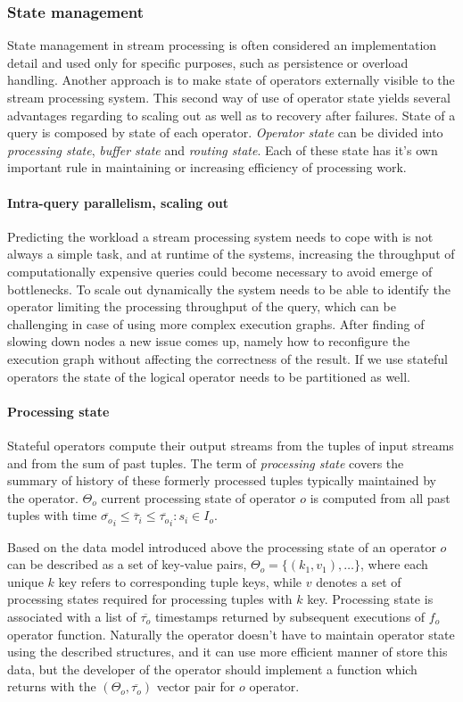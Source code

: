 \subsubsection{State management}
State management in stream processing is often considered an implementation detail and used only for specific purposes, such as persistence or overload handling. Another approach is to make state of operators externally visible to the stream processing system. This second way of use of operator state yields several advantages regarding to scaling out as well as  to recovery after failures.
State of a query is composed by state of each operator. \textit{Operator state} can be divided into \textit{processing state}, \textit{buffer state} and \textit{routing state}. Each of these state has it's own important rule in maintaining or increasing efficiency of processing work.
\paragraph{Intra-query parallelism, scaling out}
Predicting the workload a stream processing system needs to cope with is not always a simple task, and at runtime of the systems, increasing the throughput of computationally expensive queries could become necessary to avoid emerge of bottlenecks. To scale out dynamically the system needs to be able to identify the operator limiting the processing throughput of the query, which can be challenging in case of using more complex execution graphs. After finding of slowing down nodes a new issue comes up, namely how to reconfigure the execution graph without affecting the correctness of the result. If we use stateful operators the state of the logical operator needs to be partitioned as well.
\paragraph{Processing state}
Stateful operators compute their output streams from the tuples of input streams and from the sum of past tuples.
The term of \textit{processing state} covers the summary of history of these formerly processed tuples  typically maintained by the operator. $\Theta_o$ current processing state of operator $o$ is computed from all past tuples with time $\overline{\sigma_o}_i \leq \overline{\tau}_i \leq \overline{\tau_o}_i : s_i \in I_o $. 

Based on the data model introduced above the processing state of an operator $o$ can be described as a set of key-value pairs, $\Theta_o=\{ (k_1,v_1),\dots\}$, where each unique $k$ key refers to corresponding tuple keys, while $v$ denotes a set of  processing states required for processing tuples with $k$ key. Processing state is associated with a list of $\overline{\tau_o}$ timestamps returned by subsequent executions of $f_o$ operator function.
Naturally the operator doesn't have to maintain operator state using the described structures, and it can use more efficient manner of store this data, but the developer of the operator should implement a function which returns with the $(\Theta_o,\overline{\tau_o})$ vector pair for $o$ operator. 

